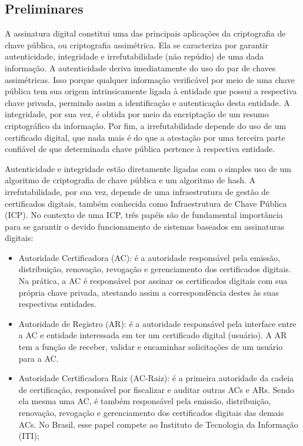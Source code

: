 \documentclass[12pt]{article}
\begin{document}
\subsection{Preliminares}
A assinatura digital constitui uma das principais aplicações da criptografia de chave pública, ou criptografia assimétrica.
Ela se caracteriza por garantir autenticidade, integridade e irrefutabilidade (não repúdio) de uma dada informação.
A autenticidade deriva imediatamente do uso do par de chaves assimétricas. 
Isso porque qualquer informação verificável por meio de uma chave pública tem sua origem intrinsicamente ligada à entidade que possui a respectiva chave privada, permindo assim a identificação e autenticação desta entidade.
A integridade, por sua vez, é obtida por meio da encriptação de um resumo criptográfico da informação.
Por fim, a irrefutabilidade depende do uso de um certificado digital, que nada mais é do que a atestação por uma terceira parte confiável de que determinada chave pública pertence à respectiva entidade.

Autenticidade e integridade estão diretamente ligadas com o simples uso de um algoritmo de criptografia de chave pública e um algoritmo de hash.
A irrefutabilidade, por sua vez, depende de uma infraestrutura de gestão de certificados digitais, também conhecida como Infraestrutura de Chave Pública (ICP).
No contexto de uma ICP, três papéis são de fundamental importância para se garantir o devido funcionamento de sistemas baseados em assinaturas digitais:

\begin{itemize}
    \item Autoridade Certificadora (AC): é a autoridade responsável pela emissão, distribuição, renovação, revogação e gerenciamento dos certificados digitais. Na prática, a AC é responsável por assinar os certificados digitais com sua própria chave privada, atestando assim a correspondência destes às suas respectivas entidades.
    \item Autoridade de Registro (AR): é a autoridade responsável pela interface entre a AC e entidade interessada em ter um certificado digital (usuário). A AR tem a função de receber, validar e encaminhar solicitações de um usuário para a AC.
    \item Autoridade Certificadora Raiz (AC-Raiz): é a primeira autoridade da cadeia de certificação, responsável por fiscalizar e auditar outras ACs e ARs. Sendo ela mesma uma AC, é também responsável pela  emissão, distribuição, renovação, revogação e gerenciamento dos certificados digitais das demais ACs. No Brasil, esse papel compete ao Instituto de Tecnologia da Informação (ITI);
\end{itemize}
\end{document}
